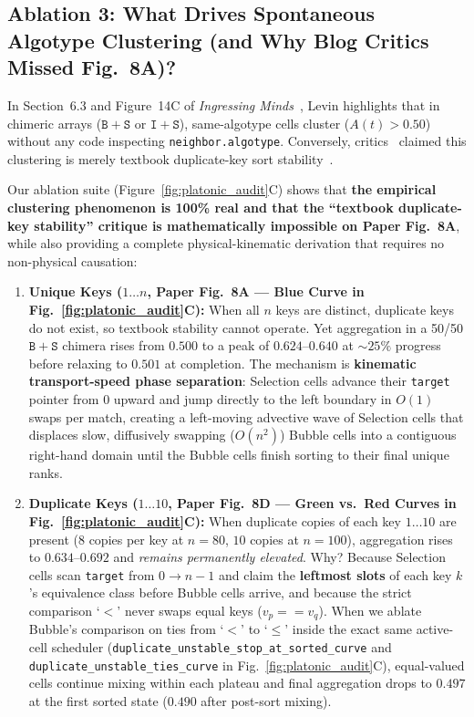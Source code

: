 \documentclass[11pt,a4paper]{article}
\theoremstyle{definition}
\theoremstyle{remark}
\begin{document}
\subsection{Ablation 3: What Drives Spontaneous Algotype Clustering (and Why Blog Critics Missed Fig.~8A)?}

In Section~6.3 and Figure~14C of \emph{Ingressing Minds}~\cite{Levin2026Philosophies}, Levin highlights that in chimeric arrays ($\mathtt{B+S}$ or $\mathtt{I+S}$), same-algotype cells cluster ($A(t) > 0.50$) without any code inspecting \texttt{neighbor.algotype}. Conversely, critics~\cite{Sweet2026} claimed this clustering is merely textbook duplicate-key sort stability~\cite{Knuth1973}.

Our ablation suite (Figure~\ref{fig:platonic_audit}C) shows that \textbf{the empirical clustering phenomenon is 100\% real and that the ``textbook duplicate-key stability'' critique is mathematically impossible on Paper Fig.~8A}, while also providing a complete physical-kinematic derivation that requires no non-physical causation:
\begin{enumerate}
  \item \textbf{Unique Keys ($1 \dots n$, Paper Fig.~8A — Blue Curve in Fig.~\ref{fig:platonic_audit}C):} When all $n$ keys are distinct, duplicate keys do not exist, so textbook stability cannot operate. Yet aggregation in a 50/50 $\mathtt{B+S}$ chimera rises from $0.500$ to a peak of $\mathbf{0.624\text{--}0.640}$ at $\sim 25\%$ progress before relaxing to $0.501$ at completion. The mechanism is \textbf{kinematic transport-speed phase separation}: Selection cells advance their \texttt{target} pointer from $0$ upward and jump directly to the left boundary in $O(1)$ swaps per match, creating a left-moving advective wave of Selection cells that displaces slow, diffusively swapping ($O(n^2)$) Bubble cells into a contiguous right-hand domain until the Bubble cells finish sorting to their final unique ranks.
  \item \textbf{Duplicate Keys ($1 \dots 10$, Paper Fig.~8D — Green vs.\ Red Curves in Fig.~\ref{fig:platonic_audit}C):} When duplicate copies of each key $1 \dots 10$ are present ($8$ copies per key at $n=80$, $10$ copies at $n=100$), aggregation rises to $\mathbf{0.634\text{--}0.692}$ and \emph{remains permanently elevated}. Why? Because Selection cells scan \texttt{target} from $0 \to n-1$ and claim the \textbf{leftmost slots} of each key $k$'s equivalence class before Bubble cells arrive, and because the strict comparison `$<$' never swaps equal keys ($v_p == v_q$). When we ablate Bubble's comparison on ties from `$<$' to `$\le$' inside the exact same active-cell scheduler (\texttt{duplicate\_unstable\_stop\_at\_sorted\_curve} and \texttt{duplicate\_unstable\_ties\_curve} in Fig.~\ref{fig:platonic_audit}C), equal-valued cells continue mixing within each plateau and final aggregation drops to $\mathbf{0.497}$ at the first sorted state ($\mathbf{0.490}$ after post-sort mixing).
\end{enumerate}
\end{document}
